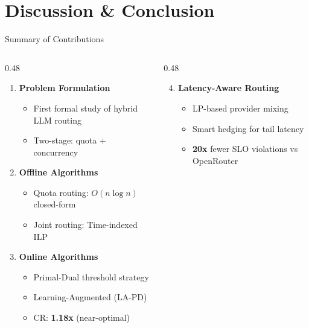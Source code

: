 \documentclass[aspectratio=169,10pt]{beamer}
\begin{document}
\section{Discussion \& Conclusion}

\begin{frame}{Summary of Contributions}
\begin{columns}[T]
\begin{column}{0.48\textwidth}
\begin{enumerate}
    \item \textbf{Problem Formulation}
    \begin{itemize}
        \item First formal study of hybrid LLM routing
        \item Two-stage: quota + concurrency
    \end{itemize}

    \vspace{0.2cm}
    \item \textbf{Offline Algorithms}
    \begin{itemize}
        \item Quota routing: $O(n \log n)$ closed-form
        \item Joint routing: Time-indexed ILP
    \end{itemize}

    \vspace{0.2cm}
    \item \textbf{Online Algorithms}
    \begin{itemize}
        \item Primal-Dual threshold strategy
        \item Learning-Augmented (LA-PD)
        \item CR: \textbf{1.18x} (near-optimal)
    \end{itemize}
\end{enumerate}
\end{column}

\begin{column}{0.48\textwidth}
\begin{enumerate}
    \setcounter{enumi}{3}
    \item \textbf{Latency-Aware Routing}
    \begin{itemize}
        \item LP-based provider mixing
        \item Smart hedging for tail latency
        \item \textbf{20x} fewer SLO violations vs OpenRouter
    \end{itemize}


\end{enumerate}
\end{column}
\end{columns}
\end{frame}
\end{document}
